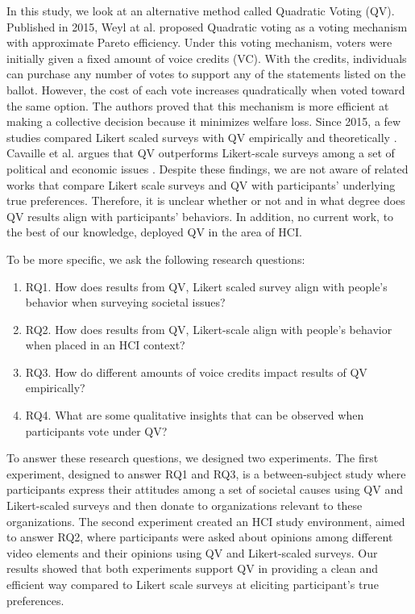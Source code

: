 In this study, 
we look at an alternative method
called Quadratic Voting (QV).
Published in 2015,
Weyl at al. \cite{posner2018radical}
proposed Quadratic voting
as a voting mechanism 
with approximate Pareto efficiency.
Under this voting mechanism,
voters were initially given 
a fixed amount of voice credits (VC).
With the credits, 
individuals can purchase 
any number of votes to support any of the statements
listed on the ballot.
However, the cost of each vote 
increases quadratically 
when voted toward the same option.
The authors proved that this 
mechanism is more efficient 
at making a collective decision 
because it minimizes welfare loss.
Since 2015, a few studies
compared Likert scaled surveys with QV 
empirically and theoretically
\cite{quarfoot2017quadratic, naylor2017first}.
Cavaille et al. argues that 
QV outperforms Likert-scale surveys 
among a set of political and economic issues 
\cite{cavaille2018towards}.
Despite these findings,
we are not aware of related works that
compare Likert scale surveys and QV
with participants' underlying true preferences.
Therefore, it is unclear whether or not
and in what degree
does QV results align with participants' behaviors.
In addition, 
no current work, to the best of our knowledge,
deployed QV in the area of HCI.

To be more specific, 
we ask the following research questions:
\begin{enumerate}[label={},leftmargin=\parindent]
    \item RQ1. How does results from 
               QV, Likert scaled survey
               align with people's behavior 
               when surveying societal issues?
    \item RQ2. How does results from 
               QV, Likert-scale 
               align with people's behavior 
               when placed in an HCI context?
    \item RQ3. How do different amounts of
               voice credits impact results of QV empirically?
    \item RQ4. What are some qualitative insights that can be observed
               when participants vote under QV?
\end{enumerate}
To answer these research questions,
we designed two experiments.
The first experiment,
designed to answer RQ1 and RQ3,
is a between-subject study
where participants express their attitudes
among a set of societal causes using 
QV and Likert-scaled surveys
and then donate
to organizations relevant to these organizations.
The second experiment 
created an HCI study environment,
aimed to answer RQ2,
where participants were asked about 
opinions among different video elements
and their opinions using QV and Likert-scaled surveys.
Our results showed that both experiments support
QV in providing a clean and efficient way
compared to Likert scale surveys
at eliciting participant's true preferences.

